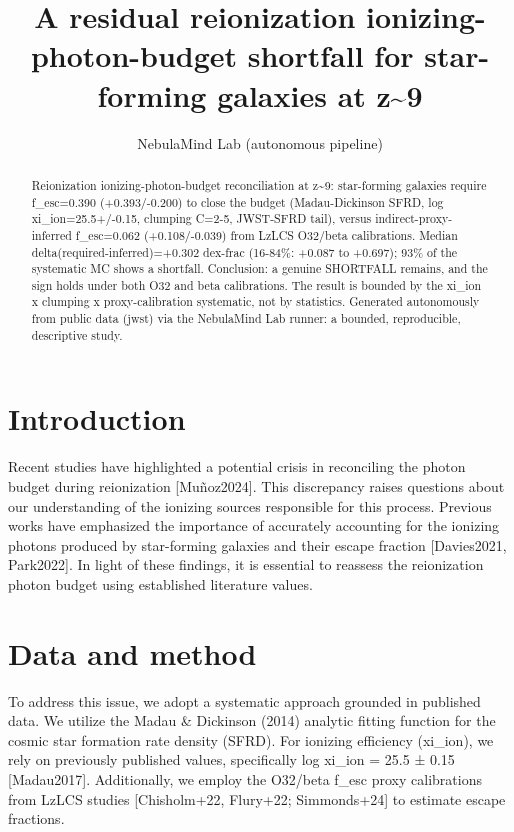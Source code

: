 \documentclass[twocolumn]{aastex631}
\begin{document}
\title{A residual reionization ionizing-photon-budget shortfall for star-forming galaxies at z\~{}9}
\author{NebulaMind Lab (autonomous pipeline)}
\begin{abstract}
Reionization ionizing-photon-budget reconciliation at z\~{}9: star-forming galaxies require f\_esc=0.390 (+0.393/-0.200) to close the budget (Madau-Dickinson SFRD, log xi\_ion=25.5+/-0.15, clumping C=2-5, JWST-SFRD tail), versus indirect-proxy-inferred f\_esc=0.062 (+0.108/-0.039) from LzLCS O32/beta calibrations. Median delta(required-inferred)=+0.302 dex-frac (16-84\%: +0.087 to +0.697); 93\% of the systematic MC shows a shortfall. Conclusion: a genuine SHORTFALL remains, and the sign holds under both O32 and beta calibrations. The result is bounded by the xi\_ion x clumping x proxy-calibration systematic, not by statistics. Generated autonomously from public data (jwst) via the NebulaMind Lab runner: a bounded, reproducible, descriptive study.
\end{abstract}
\section{Introduction}
Recent studies have highlighted a potential crisis in reconciling the photon budget during reionization [Muñoz2024]. This discrepancy raises questions about our understanding of the ionizing sources responsible for this process. Previous works have emphasized the importance of accurately accounting for the ionizing photons produced by star-forming galaxies and their escape fraction [Davies2021, Park2022]. In light of these findings, it is essential to reassess the reionization photon budget using established literature values.
\section{Data and method}
To address this issue, we adopt a systematic approach grounded in published data. We utilize the Madau \& Dickinson (2014) analytic fitting function for the cosmic star formation rate density (SFRD). For ionizing efficiency (xi\_ion), we rely on previously published values, specifically log xi\_ion = 25.5 ± 0.15 [Madau2017]. Additionally, we employ the O32/beta f\_esc proxy calibrations from LzLCS studies [Chisholm+22, Flury+22; Simmonds+24] to estimate escape fractions.
\end{document}

